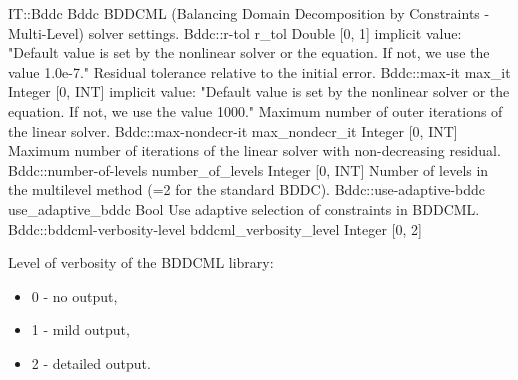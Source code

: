 \begin{RecordType}
	{IT::Bddc}
	{Bddc}
	{}%
	{}%
	{{{BDDCML (Balancing Domain Decomposition by Constraints - Multi-Level) solver settings.}%
}}
		\RecKey
			{Bddc::r-tol}
			{r{\_}tol}
			{{Double [0, 1]}}{}
			{implicit value: "{Default value is set by the nonlinear solver or the equation. If not, we use the value 1.0e-7.}"}
			{{{Residual tolerance relative to the initial error.}%
}}
		\RecKey
			{Bddc::max-it}
			{max{\_}it}
			{{Integer [0, INT]}}{}
			{implicit value: "{Default value is set by the nonlinear solver or the equation. If not, we use the value 1000.}"}
			{{{Maximum number of outer iterations of the linear solver.}%
}}
		\RecKey
			{Bddc::max-nondecr-it}
			{max{\_}nondecr{\_}it}
			{{Integer [0, INT]}}{}
			{ }
			{{{Maximum number of iterations of the linear solver with non-decreasing residual.}%
}}
		\RecKey
			{Bddc::number-of-levels}
			{number{\_}of{\_}levels}
			{{Integer [0, INT]}}{}
			{ }
			{{{Number of levels in the multilevel method (=2 for the standard BDDC).}%
}}
		\RecKey
			{Bddc::use-adaptive-bddc}
			{use{\_}adaptive{\_}bddc}
			{{Bool}}{}
			{ }
			{{{Use adaptive selection of constraints in BDDCML.}%
}}
		\RecKey
			{Bddc::bddcml-verbosity-level}
			{bddcml{\_}verbosity{\_}level}
			{{Integer [0, 2]}}{}
			{ }
			{{{{Level of verbosity of the BDDCML library:}
% 
}
\begin{itemize}
\item {0 - no output,}
\item {1 - mild output,}
\item {2 - detailed output.}
\end{itemize}
}}
\end{RecordType}
